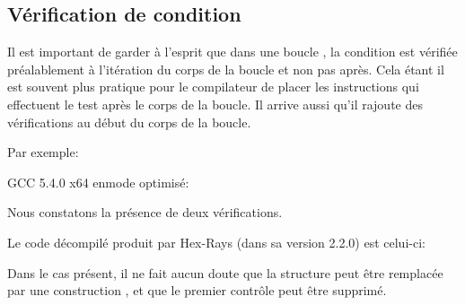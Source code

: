 ﻿\subsection{Vérification de condition}

Il est important de garder à l'esprit que dans une boucle , la condition est vérifiée 
préalablement à l'itération du corps de la boucle et non pas après. Cela étant il est souvent plus 
pratique pour le compilateur de placer les instructions qui effectuent le test après le corps de 
la boucle. Il arrive aussi qu'il rajoute des vérifications au début du corps de la boucle.

Par exemple:



GCC 5.4.0 x64 enmode optimisé:



Nous constatons la présence de deux vérifications.

Le code décompilé produit par Hex-Rays (dans sa version 2.2.0) est celui-ci:



Dans le cas présent, il ne fait aucun doute que la structure  peut être remplacée par 
une construction , et que le premier contrôle peut être supprimé.

